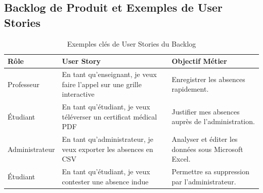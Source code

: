 \documentclass[12pt,a4paper]{article}
\begin{document}
\subsection{Backlog de Produit et Exemples de User Stories}
\begin{table}[htbp]
    \centering
    \caption{Exemples clés de User Stories du Backlog}
    \vspace{0.3cm}
    \begin{tabular}{lp{6cm}p{5cm}}
        \toprule
        \textbf{Rôle} & \textbf{User Story} & \textbf{Objectif Métier} \\
        \midrule
        Professeur & En tant qu'enseignant, je veux faire l'appel sur une grille interactive & Enregistrer les absences rapidement. \\
        Étudiant & En tant qu'étudiant, je veux téléverser un certificat médical PDF & Justifier mes absences auprès de l'administration. \\
        Administrateur & En tant qu'administrateur, je veux exporter les absences en CSV & Analyser et éditer les données sous Microsoft Excel. \\
        Étudiant & En tant qu'étudiant, je veux contester une absence indue & Permettre sa suppression par l'administrateur. \\
        \bottomrule
    \end{tabular}
\end{table}
\end{document}
